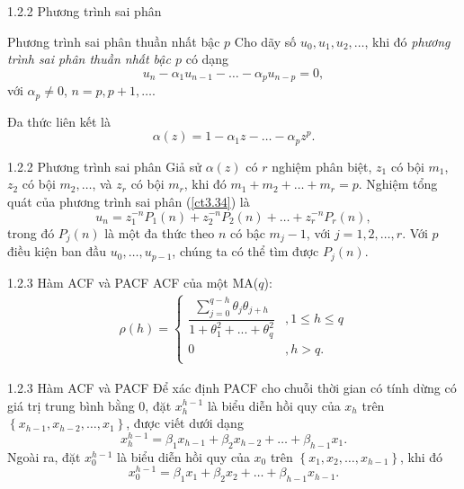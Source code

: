 \documentclass[notheorems,envcountsect,hyperref=unicode]{beamer}
\begin{document}
\begin{frame}{1.2.2 Phương trình sai phân}
	\begin{block}{Phương trình sai phân thuần nhất bậc $p$}
		Cho dãy số $u_0, u_1, u_2, \dots$, khi đó \textit{phương trình sai phân thuần nhất bậc $p$} có dạng
		\begin{equation}
		u_n-\alpha_1 u_{n-1}-\dots-\alpha_p u_{n-p}=0,  \label{ct3.34}
		\end{equation}
		với $\alpha_p\neq 0$, $n=p, p+1,\dots.$
	\end{block}
	Đa thức liên kết là 
	$$\alpha(z)=1-\alpha_1z-\dots-\alpha_pz^p.$$
\end{frame}

\begin{frame}{1.2.2 Phương trình sai phân}
Giả sử $\alpha(z)$ có $r$ nghiệm phân biệt, $z_1$ có bội $m_1$, $z_2$ có bội $m_2, \dots$, và $z_r$ có bội $m_r$, khi đó $m_1+ m_2+ \dots+ m_r=p$. Nghiệm tổng quát của phương trình sai phân (\ref{ct3.34}) là
\begin{equation}
u_n=z_1^{-n}P_1(n)+ z_2^{-n}P_{2}(n)+ \dots+ z_r^{-n}P_r(n), 
\end{equation}
trong đó $P_j(n)$ là một đa thức theo $n$ có bậc $m_j-1$, với $j = 1, 2, \dots, r$. Với $p$ điều kiện ban đầu $u_0, \dots, u_{p-1}$, chúng ta có thể tìm được $P_j(n)$.
\end{frame}


\begin{frame}{1.2.3 Hàm ACF và PACF}
ACF của một MA($q$):
\begin{align}
\rho(h) =
\begin{cases} 
\displaystyle\dfrac{\displaystyle\sum_{j=0}^{q-h}\theta_{j}\theta_{j+h}}{1+\theta_1^{2}+...+\theta_q^{2}}&, 1 \leq h \leq q\\ 
0&, h > q.\\
\end{cases}
\label{ct3.39}
\end{align}
\end{frame}

\begin{frame}{1.2.3 Hàm ACF và PACF}
Để xác định PACF cho chuỗi thời gian có tính dừng có giá trị trung bình bằng $0$, đặt $x_h^{h-1}$ là biểu diễn hồi quy của $x_{h}$ trên $\left\lbrace x_{h-1}, x_{h-2}, \dots, x_{1}\right\rbrace$, được viết dưới dạng
\begin{equation}
x_h^{h-1}= \beta_{1}x_{h-1}+ \beta_{2}x_{h-2}+ \dots+ \beta_{h-1}x_{1}. \label{ct1.128}
\end{equation}
Ngoài ra, đặt $x_0^{h-1}$ là biểu diễn hồi quy của $x_{0}$ trên $\left\lbrace x_{1}, x_{2}, \dots, x_{h-1}\right\rbrace$, khi đó 
\begin{equation}
x_0^{h-1} = \beta_{1}x_{1}+\beta_{2}x_{2}+ \dots+ \beta_{h-1}x_{h-1}. \label{ct1.129}
\end{equation}
\end{frame}
\end{document}
